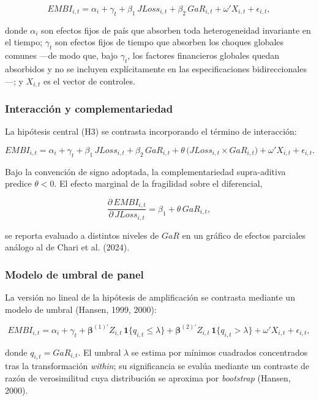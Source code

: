 \documentclass[5p,times,twocolumn,authoryear]{elsarticle}
\begin{document}
\[ EMBI_{i,t} = \alpha_i + \gamma_t + \beta_1\,JLoss_{i,t} + \beta_2\,GaR_{i,t} + \omega'X_{i,t} + \epsilon_{i,t}, \]

donde $\alpha_i$ son efectos fijos de país que absorben toda heterogeneidad invariante en el tiempo; $\gamma_t$ son efectos fijos de tiempo que absorben los choques globales comunes —de modo que, bajo $\gamma_t$, los factores financieros globales quedan absorbidos y no se incluyen explícitamente en las especificaciones bidireccionales—; y $X_{i,t}$ es el vector de controles.

\subsubsection{Interacción y complementariedad}

La hipótesis central (H3) se contrasta incorporando el término de interacción:

\[ EMBI_{i,t} = \alpha_i + \gamma_t + \beta_1\,JLoss_{i,t} + \beta_2\,GaR_{i,t} + \theta\,\bigl(JLoss_{i,t}\times GaR_{i,t}\bigr) + \omega'X_{i,t} + \epsilon_{i,t}. \]

Bajo la convención de signo adoptada, la complementariedad supra-aditiva predice $\theta < 0$. El efecto marginal de la fragilidad sobre el diferencial,

\[ \frac{\partial\,EMBI_{i,t}}{\partial\,JLoss_{i,t}} = \beta_1 + \theta\,GaR_{i,t}, \]

se reporta evaluado a distintos niveles de $GaR$ en un gráfico de efectos parciales análogo al de Chari et al. (2024).

\subsubsection{Modelo de umbral de panel}

La versión no lineal de la hipótesis de amplificación se contrasta mediante un modelo de umbral (Hansen, 1999, 2000):

\[ EMBI_{i,t} = \alpha_i + \gamma_t + \boldsymbol{\beta}^{(1)'} Z_{i,t}\,\mathbf{1}\{q_{i,t}\le\lambda\} + \boldsymbol{\beta}^{(2)'} Z_{i,t}\,\mathbf{1}\{q_{i,t}>\lambda\} + \omega'X_{i,t} + \epsilon_{i,t}, \]

donde $q_{i,t}=GaR_{i,t}$. El umbral $\lambda$ se estima por mínimos cuadrados concentrados tras la transformación \textit{within}; su significancia se evalúa mediante un contraste de razón de verosimilitud cuya distribución se aproxima por \textit{bootstrap} (Hansen, 2000).
\end{document}

